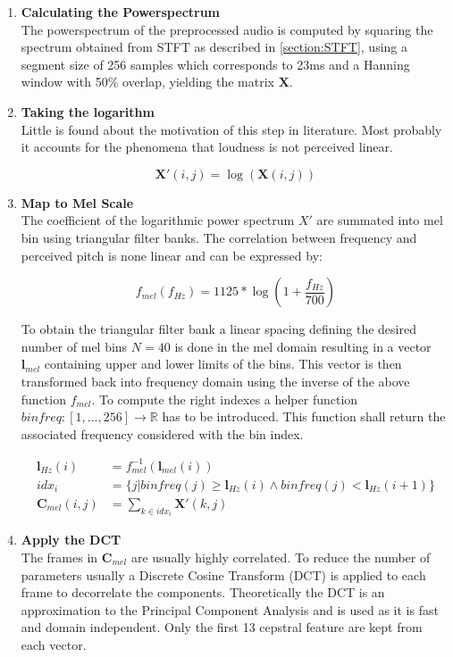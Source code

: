 \documentclass[cic,tc,english]{iiufrgs}
\begin{document}
\begin{enumerate}

\item \textbf{Calculating the Powerspectrum} \\ The powerspectrum of the preprocessed audio is computed by squaring the spectrum obtained from STFT as described in \ref{section:STFT}, using a segment size of 256 samples which corresponds to 23ms and a Hanning window with 50\% overlap, yielding the matrix $\bm{X}$.

\item \textbf{Taking the logarithm} \\ Little is found about the motivation of this step in literature. Most probably it accounts for the phenomena that loudness is not perceived linear.

\begin{equation}
\bm{X}'(i,j) = \log (\bm{X}(i,j))
\end{equation}

\item \textbf{Map to Mel Scale} \\ The coefficient of the logarithmic power spectrum $X'$ are summated into mel bin using triangular filter banks. The correlation between frequency and perceived pitch is none linear and can be expressed by:

\begin{equation}
f_{mel}(f_{Hz}) = 1125 * \log(1+\frac{f_{Hz}}{700})
\end{equation}

To obtain the triangular filter bank a linear spacing defining the desired number of mel bins $N=40$ is done in the mel domain resulting in a vector $\bm{l}_{mel}$ containing upper and lower limits of the bins. This vector is then transformed back into frequency domain using the inverse of the above function $f_{mel}$. To compute the right indexes a helper function $binfreq: [1,\ldots, 256] \rightarrow \mathbb{R}$ has to be introduced. This function shall return the associated frequency considered with the bin index.

\begin{equation}
\begin{split}
\bm{l}_{Hz}(i) &= f_{mel}^{-1}(\bm{l}_{mel}(i)) \\
idx_i &= \{ j \vert binfreq(j) \geq \bm{l}_{Hz}(i) \land binfreq(j) < \bm{l}_{Hz}(i+1) \} \\
\bm{C}_{mel}(i,j) &= \sum_{k \in idx_i} \bm{X}'(k,j)
\end{split}
\end{equation}

\item \textbf{Apply the DCT} \\ The frames in $\bm{C}_{mel}$ are usually highly correlated. To reduce the number of parameters usually a Discrete Cosine Transform (DCT) is applied to each frame to decorrelate the components. Theoretically the DCT is an approximation to the Principal Component Analysis and is used as it is fast and domain independent. Only the first 13 cepstral feature are kept from each vector.

\end{enumerate}
\end{document}
